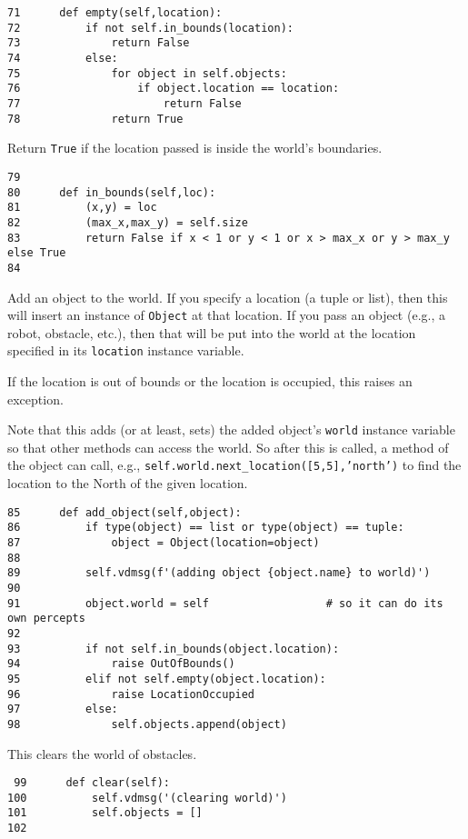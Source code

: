 \documentclass[11pt]{tufte-handout}
\begin{document}
\begin{verbatim}
71      def empty(self,location):
72          if not self.in_bounds(location):
73              return False
74          else:
75              for object in self.objects:
76                  if object.location == location:
77                      return False
78              return True
\end{verbatim}

Return \texttt{True} if the location passed is inside the world's boundaries.
\begin{verbatim}
79  
80      def in_bounds(self,loc):
81          (x,y) = loc
82          (max_x,max_y) = self.size
83          return False if x < 1 or y < 1 or x > max_x or y > max_y else True
84  
\end{verbatim}

Add an object to the world.  If you specify a location (a tuple or list), then this will insert an instance of \texttt{Object} at that location.  If you pass an object (e.g., a robot, obstacle, etc.), then that will be put into the world at the location specified in its \texttt{location} instance variable.

If the location is out of bounds or the location is occupied, this raises an exception.

Note that this adds (or at least, sets) the added object's \texttt{world} instance variable so that other methods can access the world.  So after this is called, a method of the object can call, e.g., \texttt{self.world.next\_location([5,5],'north')} to find the location to the North of the given location.

\begin{verbatim}
85      def add_object(self,object):
86          if type(object) == list or type(object) == tuple:
87              object = Object(location=object)
88  
89          self.vdmsg(f'(adding object {object.name} to world)')
90  
91          object.world = self                  # so it can do its own percepts
92  
93          if not self.in_bounds(object.location):
94              raise OutOfBounds()
95          elif not self.empty(object.location):
96              raise LocationOccupied
97          else:
98              self.objects.append(object)
\end{verbatim}

This clears the world of obstacles.

\begin{verbatim}
 99      def clear(self):
100          self.vdmsg('(clearing world)')
101          self.objects = []
102  
\end{verbatim}
\end{document}
